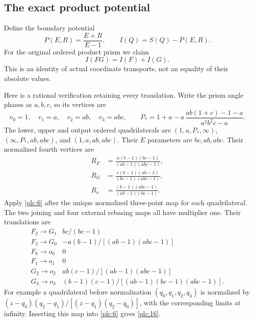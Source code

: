 \subsection{The exact product
potential}\label{the-exact-product-potential}

Define the boundary potential \begin{equation}
P(E,R)=\frac{E+R}{E-1},\qquad I(Q)=S(Q)-P(E,R).
\label{plc:12}
\end{equation} For the original ordered product prism we claim \begin{equation}
I(FG)=I(F)+I(G).
\label{plc:13}
\end{equation} This is an identity of actual coordinate transports, not an equality
of their absolute values.

Here is a rational verification retaining every translation. Write the
prism angle phases as \(a,b,c\), so its vertices are \begin{equation}
v_0=1,\quad v_1=a,\quad v_2=ab,\quad v_3=abc,\qquad
 P_*=
 1+a-a\,\frac{ab(1+c)-1-a}{a^2b^2c-a}.
\label{plc:14}
\end{equation} The lower, upper and output ordered quadrilaterals are
\((1,a,P_*,\infty)\), \((\infty,P_*,ab,abc)\), and \((1,a,ab,abc)\).
Their \(E\) parameters are \(bc,ab,abc\). Their normalized fourth
vertices are \begin{equation}
\begin{aligned}
 R_F&=\frac{a(b-1)(bc-1)}{(ab-1)(abc-1)},\\
 R_G&=\frac{c(b-1)(ab-1)}{(bc-1)(abc-1)},\\
 R_o&=\frac{(b-1)(abc-1)}{(ab-1)(bc-1)}.
\end{aligned}
\label{plc:15}
\end{equation} Apply \eqref{plc:6} after the unique normalized three-point map for each
quadrilateral. The two joining and four external rebasing maps all have
multiplier one. Their translations are \begin{equation}
\begin{array}{c|c}
F_2\longrightarrow G_1&bc/(bc-1)\\
F_3\longrightarrow G_0&-a(b-1)/[(ab-1)(abc-1)]\\
F_0\longrightarrow o_0&0\\
F_1\longrightarrow o_1&0\\
G_2\longrightarrow o_2&ab(c-1)/[(ab-1)(abc-1)]\\
G_3\longrightarrow o_3&(b-1)(c-1)/[(ab-1)(bc-1)(abc-1)].
\end{array}
\label{plc:16}
\end{equation} For example a quadrilateral before normalization \((q_0,q_1,q_2,q_3)\) is normalized
by \((z-q_0)(q_2-q_1)/[(z-q_1)(q_2-q_0)]\), with the corresponding
limits at infinity. Inserting this map into \eqref{plc:6} gives \eqref{plc:16}.

